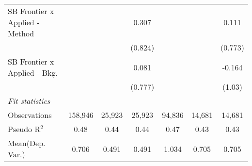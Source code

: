 \begin{tabular}{lcccccc}
   SB Frontier x Applied - Method &               &             & 0.307        &               &              & 0.111\\   
                                  &               &             & (0.824)      &               &              & (0.773)\\   
   SB Frontier x Applied - Bkg.   &               &             & 0.081        &               &              & -0.164\\   
                                  &               &             & (0.777)      &               &              & (1.03)\\   
   \midrule
   \emph{Fit statistics}\\
   Observations                   & 158,946       & 25,923      & 25,923       & 94,836        & 14,681       & 14,681\\  
   Pseudo R$^2$                   & 0.48          & 0.44        & 0.44         & 0.47          & 0.43         & 0.43\\  
Mean(Dep. Var.) & 0.706 & 0.491 & 0.491 & 1.034 & 0.705 & 0.705 \\
   

\end{tabular}
